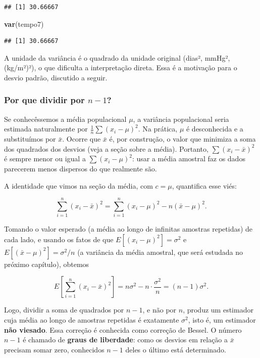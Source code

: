 \documentclass[
]{book}
\newenvironment{Shaded}{\begin{snugshade}}{\end{snugshade}}
\newcommand{\FunctionTok}[1]{\textcolor[rgb]{0.13,0.29,0.53}{\textbf{#1}}}
\newcommand{\NormalTok}[1]{#1}
\begin{document}
\begin{verbatim}
## [1] 30.66667
\end{verbatim}

\begin{Shaded}
\begin{Highlighting}[]
\FunctionTok{var}\NormalTok{(tempo7)}
\end{Highlighting}
\end{Shaded}

\begin{verbatim}
## [1] 30.66667
\end{verbatim}

A unidade da variância é o quadrado da unidade original (dias², mmHg², (kg/m²)²), o que dificulta a interpretação direta. Essa é a motivação para o desvio padrão, discutido a seguir.

\subsubsection{\texorpdfstring{Por que dividir por \(n - 1\)?}{Por que dividir por n - 1?}}\label{por-que-dividir-por-n---1}

Se conhecêssemos a média populacional \(\mu\), a variância populacional seria estimada naturalmente por \(\frac{1}{n}\sum (x_i - \mu)^2\). Na prática, \(\mu\) é desconhecida e a substituímos por \(\bar{x}\). Ocorre que \(\bar{x}\) é, por construção, o valor que minimiza a soma dos quadrados dos desvios (veja a seção sobre a média). Portanto, \(\sum (x_i - \bar{x})^2\) é sempre menor ou igual a \(\sum (x_i - \mu)^2\): usar a média amostral faz os dados parecerem menos dispersos do que realmente são.

A identidade que vimos na seção da média, com \(c = \mu\), quantifica esse viés:

\[
\sum_{i=1}^{n}(x_i - \bar{x})^2 = \sum_{i=1}^{n}(x_i - \mu)^2 - n(\bar{x} - \mu)^2 .
\]

Tomando o valor esperado (a média ao longo de infinitas amostras repetidas) de cada lado, e usando os fatos de que \(E[(x_i - \mu)^2] = \sigma^2\) e \(E[(\bar{x} - \mu)^2] = \sigma^2/n\) (a variância da média amostral, que será estudada no próximo capítulo), obtemos

\[
E\left[\sum_{i=1}^{n}(x_i - \bar{x})^2\right] = n\sigma^2 - n\cdot\frac{\sigma^2}{n} = (n - 1)\sigma^2 .
\]

Logo, dividir a soma de quadrados por \(n - 1\), e não por \(n\), produz um estimador cuja média ao longo de amostras repetidas é exatamente \(\sigma^2\), isto é, um estimador \textbf{não viesado}. Essa correção é conhecida como correção de Bessel. O número \(n - 1\) é chamado de \textbf{graus de liberdade}: como os desvios em relação a \(\bar{x}\) precisam somar zero, conhecidos \(n - 1\) deles o último está determinado.
\end{document}
